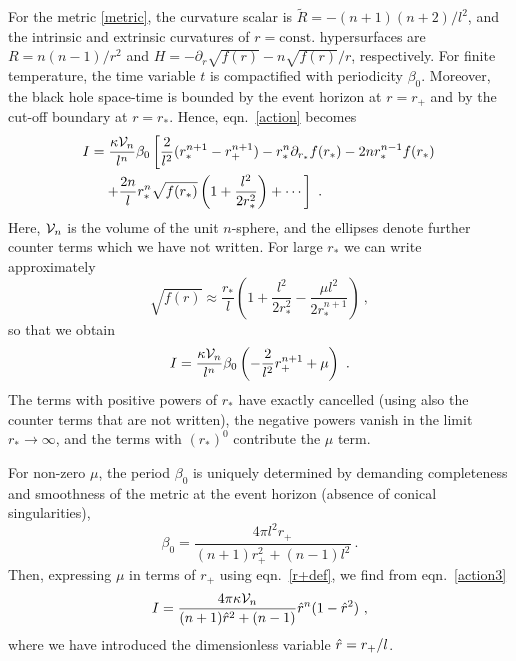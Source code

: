 \documentclass[a4paper,12pt]{article}
\begin{document}
For the metric \eqref{metric}, the
curvature scalar is $\tilde{R} = -(n+1)(n+2)/l^2$, and the intrinsic
and extrinsic curvatures of $r=\mathrm{const.}$ hypersurfaces are
$R=n(n-1)/r^2$ and $H=-\partial_r \sqrt{f(r)} -n \sqrt{f(r)}
/r$, respectively. For finite temperature, the time variable $t$ is
compactified with periodicity $\beta_0$. Moreover, the black hole
space-time is bounded by the event horizon at $r=r_+$ and by the
cut-off boundary at $r=r_\ast$. Hence, eqn.\ \eqref{action} becomes
\begin{equation}
\label{action2}
\begin{split}
  I &= \frac{\kappa \mathcal{V}_n}{l^n} \beta_0 \left[ \frac2{l^2} (r_\ast^{n+1}
  - r_+^{n+1} ) -r_\ast^n \partial_{r_\ast} f(r_\ast) -2n r_\ast^{n-1}
  f(r_\ast) \right. \\
  &\quad \left. +\frac{2n}l r_\ast^n \sqrt{f(r_\ast)} \left( 1+
  \frac{l^2}{2r_\ast^2} \right) + \cdots \right]~.
\end{split}
\end{equation}
Here, $\mathcal{V}_n$ is the volume of the unit $n$-sphere, and the ellipses
denote further counter terms which we have not
written. For large $r_\ast$ we can write approximately
\begin{equation}
\label{fapprox}
  \sqrt{f(r)} \approx \frac{r_\ast}l \left( 1 + \frac{l^2}{2r_\ast^2}
  -\frac{\mu l^2}{2 r_\ast^{n+1}} \right)~,
\end{equation}
so that we obtain
\begin{equation}
\label{action3}
  I = \frac{\kappa \mathcal{V}_n}{l^n} \beta_0 \left( -
  \frac{2}{l^2} r_+^{n+1} + \mu \right)~.
\end{equation}
The terms with positive powers of $r_\ast$ have exactly
cancelled (using also the counter terms that are not written), the
negative powers vanish in the limit $r_\ast \to
\infty$, and the terms with $(r_\ast)^0$ contribute the $\mu$ term.

For non-zero $\mu$, the period $\beta_0$ is uniquely determined by
demanding completeness and smoothness of the metric at the event
horizon (absence of conical singularities),
\begin{equation}
\label{beta0}
  \beta_0 = \frac{4\pi l^2 r_+}{(n+1)r_+^2 +(n-1) l^2}~.
\end{equation}
Then, expressing $\mu$ in terms of $r_+$ using eqn.\ \eqref{r+def}, we
find from eqn.\ \eqref{action3}
\begin{equation}
\label{I}
  I= \frac{4\pi \kappa \mathcal{V}_n}{(n+1) \hat{r}^2 +(n-1)} \hat{r}^n (1-\hat{r}^2)~,
\end{equation}
where we have introduced the dimensionless variable $\hat{r}= r_+/l$.
\end{document}
